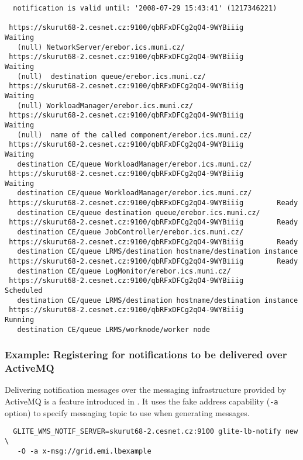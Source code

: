 \begin{verbatim}
  notification is valid until: '2008-07-29 15:43:41' (1217346221)

 https://skurut68-2.cesnet.cz:9100/qbRFxDFCg2qO4-9WYBiiig        Waiting
   (null) NetworkServer/erebor.ics.muni.cz/
 https://skurut68-2.cesnet.cz:9100/qbRFxDFCg2qO4-9WYBiiig        Waiting
   (null)  destination queue/erebor.ics.muni.cz/
 https://skurut68-2.cesnet.cz:9100/qbRFxDFCg2qO4-9WYBiiig        Waiting
   (null) WorkloadManager/erebor.ics.muni.cz/
 https://skurut68-2.cesnet.cz:9100/qbRFxDFCg2qO4-9WYBiiig        Waiting
   (null)  name of the called component/erebor.ics.muni.cz/
 https://skurut68-2.cesnet.cz:9100/qbRFxDFCg2qO4-9WYBiiig        Waiting
   destination CE/queue WorkloadManager/erebor.ics.muni.cz/
 https://skurut68-2.cesnet.cz:9100/qbRFxDFCg2qO4-9WYBiiig        Waiting
   destination CE/queue WorkloadManager/erebor.ics.muni.cz/
 https://skurut68-2.cesnet.cz:9100/qbRFxDFCg2qO4-9WYBiiig        Ready
   destination CE/queue destination queue/erebor.ics.muni.cz/
 https://skurut68-2.cesnet.cz:9100/qbRFxDFCg2qO4-9WYBiiig        Ready
   destination CE/queue JobController/erebor.ics.muni.cz/
 https://skurut68-2.cesnet.cz:9100/qbRFxDFCg2qO4-9WYBiiig        Ready
   destination CE/queue LRMS/destination hostname/destination instance
 https://skurut68-2.cesnet.cz:9100/qbRFxDFCg2qO4-9WYBiiig        Ready
   destination CE/queue LogMonitor/erebor.ics.muni.cz/
 https://skurut68-2.cesnet.cz:9100/qbRFxDFCg2qO4-9WYBiiig        Scheduled
   destination CE/queue LRMS/destination hostname/destination instance
 https://skurut68-2.cesnet.cz:9100/qbRFxDFCg2qO4-9WYBiiig        Running
   destination CE/queue LRMS/worknode/worker node

\end{verbatim}

\subsubsection{Example: Registering for notifications to be delivered over ActiveMQ}
\label{e:notifymsg}

Delivering notification messages over the messaging infrastructure provided by ActiveMQ is a feature introduced in . It uses the fake address capability (\texttt{-a} option) to specify messaging topic to use when generating messages.

\begin{verbatim}
  GLITE_WMS_NOTIF_SERVER=skurut68-2.cesnet.cz:9100 glite-lb-notify new \
   -O -a x-msg://grid.emi.lbexample
\end{verbatim}


